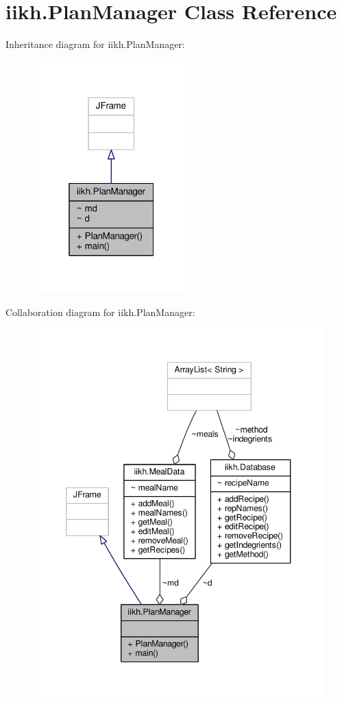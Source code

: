 \hypertarget{classiikh_1_1PlanManager}{\section{iikh.\-Plan\-Manager Class Reference}
\label{classiikh_1_1PlanManager}
}


Inheritance diagram for iikh.\-Plan\-Manager\-:
\nopagebreak
\begin{figure}[H]
\begin{center}
\leavevmode
\includegraphics[width=172pt]{classiikh_1_1PlanManager__inherit__graph}
\end{center}
\end{figure}


Collaboration diagram for iikh.\-Plan\-Manager\-:
\nopagebreak
\begin{figure}[H]
\begin{center}
\leavevmode
\includegraphics[width=346pt]{classiikh_1_1PlanManager__coll__graph}
\end{center}
\end{figure}

